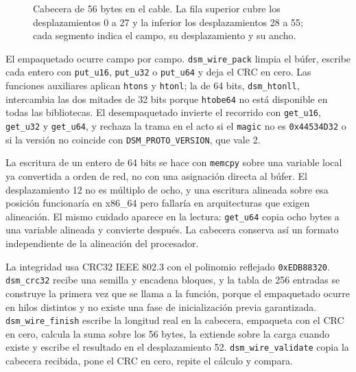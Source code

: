 \begin{figure}[H]
\caption{Cabecera de 56 bytes en el cable. La fila superior cubre los desplazamientos 0 a 27 y la inferior los desplazamientos 28 a 55; cada segmento indica el campo, su desplazamiento y su ancho.}
\label{fig:cabecera-campos}
\end{figure}

El empaquetado ocurre campo por campo. \texttt{dsm\_wire\_pack} limpia el búfer, escribe cada entero con \texttt{put\_u16}, \texttt{put\_u32} o \texttt{put\_u64} y deja el CRC en cero. Las funciones auxiliares aplican \texttt{htons} y \texttt{htonl}; la de 64 bits, \texttt{dsm\_htonll}, intercambia las dos mitades de 32 bits porque \texttt{htobe64} no está disponible en todas las bibliotecas. El desempaquetado invierte el recorrido con \texttt{get\_u16}, \texttt{get\_u32} y \texttt{get\_u64}, y rechaza la trama en el acto si el \texttt{magic} no es \texttt{0x44534D32} o si la versión no coincide con \texttt{DSM\_PROTO\_VERSION}, que vale 2.

La escritura de un entero de 64 bits se hace con \texttt{memcpy} sobre una variable local ya convertida a orden de red, no con una asignación directa al búfer. El desplazamiento 12 no es múltiplo de ocho, y una escritura alineada sobre esa posición funcionaría en x86\_64 pero fallaría en arquitecturas que exigen alineación. El mismo cuidado aparece en la lectura: \texttt{get\_u64} copia ocho bytes a una variable alineada y convierte después. La cabecera conserva así un formato independiente de la alineación del procesador.

La integridad usa CRC32 IEEE 802.3 con el polinomio reflejado \texttt{0xEDB88320}. \texttt{dsm\_crc32} recibe una semilla y encadena bloques, y la tabla de 256 entradas se construye la primera vez que se llama a la función, porque el empaquetado ocurre en hilos distintos y no existe una fase de inicialización previa garantizada. \texttt{dsm\_wire\_finish} escribe la longitud real en la cabecera, empaqueta con el CRC en cero, calcula la suma sobre los 56 bytes, la extiende sobre la carga cuando existe y escribe el resultado en el desplazamiento 52. \texttt{dsm\_wire\_validate} copia la cabecera recibida, pone el CRC en cero, repite el cálculo y compara.

